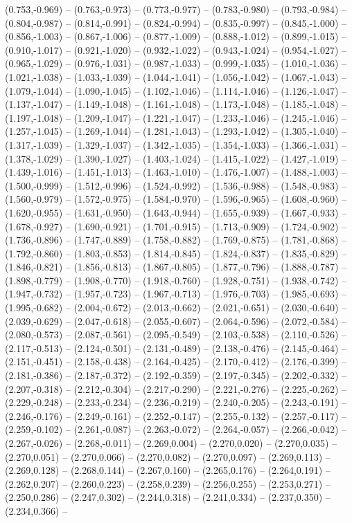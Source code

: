 (0.753,-0.969) -- (0.763,-0.973) -- (0.773,-0.977) -- (0.783,-0.980) -- (0.793,-0.984) -- (0.804,-0.987) -- (0.814,-0.991) -- (0.824,-0.994) -- (0.835,-0.997) -- (0.845,-1.000) -- (0.856,-1.003) -- (0.867,-1.006) -- (0.877,-1.009) -- (0.888,-1.012) -- (0.899,-1.015) -- (0.910,-1.017) -- (0.921,-1.020) -- (0.932,-1.022) -- (0.943,-1.024) -- (0.954,-1.027) -- (0.965,-1.029) -- (0.976,-1.031) -- (0.987,-1.033) -- (0.999,-1.035) -- (1.010,-1.036) -- (1.021,-1.038) -- (1.033,-1.039) -- (1.044,-1.041) -- (1.056,-1.042) -- (1.067,-1.043) -- (1.079,-1.044) -- (1.090,-1.045) -- (1.102,-1.046) -- (1.114,-1.046) -- (1.126,-1.047) -- (1.137,-1.047) -- (1.149,-1.048) -- (1.161,-1.048) -- (1.173,-1.048) -- (1.185,-1.048) -- (1.197,-1.048) -- (1.209,-1.047) -- (1.221,-1.047) -- (1.233,-1.046) -- (1.245,-1.046) -- (1.257,-1.045) -- (1.269,-1.044) -- (1.281,-1.043) -- (1.293,-1.042) -- (1.305,-1.040) -- (1.317,-1.039) -- (1.329,-1.037) -- (1.342,-1.035) -- (1.354,-1.033) -- (1.366,-1.031) -- (1.378,-1.029) -- (1.390,-1.027) -- (1.403,-1.024) -- (1.415,-1.022) -- (1.427,-1.019) -- (1.439,-1.016) -- (1.451,-1.013) -- (1.463,-1.010) -- (1.476,-1.007) -- (1.488,-1.003) -- (1.500,-0.999) -- (1.512,-0.996) -- (1.524,-0.992) -- (1.536,-0.988) -- (1.548,-0.983) -- (1.560,-0.979) -- (1.572,-0.975) -- (1.584,-0.970) -- (1.596,-0.965) -- (1.608,-0.960) -- (1.620,-0.955) -- (1.631,-0.950) -- (1.643,-0.944) -- (1.655,-0.939) -- (1.667,-0.933) -- (1.678,-0.927) -- (1.690,-0.921) -- (1.701,-0.915) -- (1.713,-0.909) -- (1.724,-0.902) -- (1.736,-0.896) -- (1.747,-0.889) -- (1.758,-0.882) -- (1.769,-0.875) -- (1.781,-0.868) -- (1.792,-0.860) -- (1.803,-0.853) -- (1.814,-0.845) -- (1.824,-0.837) -- (1.835,-0.829) -- (1.846,-0.821) -- (1.856,-0.813) -- (1.867,-0.805) -- (1.877,-0.796) -- (1.888,-0.787) -- (1.898,-0.779) -- (1.908,-0.770) -- (1.918,-0.760) -- (1.928,-0.751) -- (1.938,-0.742) -- (1.947,-0.732) -- (1.957,-0.723) -- (1.967,-0.713) -- (1.976,-0.703) -- (1.985,-0.693) -- (1.995,-0.682) -- (2.004,-0.672) -- (2.013,-0.662) -- (2.021,-0.651) -- (2.030,-0.640) -- (2.039,-0.629) -- (2.047,-0.618) -- (2.055,-0.607) -- (2.064,-0.596) -- (2.072,-0.584) -- (2.080,-0.573) -- (2.087,-0.561) -- (2.095,-0.549) -- (2.103,-0.538) -- (2.110,-0.526) -- (2.117,-0.513) -- (2.124,-0.501) -- (2.131,-0.489) -- (2.138,-0.476) -- (2.145,-0.464) -- (2.151,-0.451) -- (2.158,-0.438) -- (2.164,-0.425) -- (2.170,-0.412) -- (2.176,-0.399) -- (2.181,-0.386) -- (2.187,-0.372) -- (2.192,-0.359) -- (2.197,-0.345) -- (2.202,-0.332) -- (2.207,-0.318) -- (2.212,-0.304) -- (2.217,-0.290) -- (2.221,-0.276) -- (2.225,-0.262) -- (2.229,-0.248) -- (2.233,-0.234) -- (2.236,-0.219) -- (2.240,-0.205) -- (2.243,-0.191) -- (2.246,-0.176) -- (2.249,-0.161) -- (2.252,-0.147) -- (2.255,-0.132) -- (2.257,-0.117) -- (2.259,-0.102) -- (2.261,-0.087) -- (2.263,-0.072) -- (2.264,-0.057) -- (2.266,-0.042) -- (2.267,-0.026) -- (2.268,-0.011) -- (2.269,0.004) -- (2.270,0.020) -- (2.270,0.035) -- (2.270,0.051) -- (2.270,0.066) -- (2.270,0.082) -- (2.270,0.097) -- (2.269,0.113) -- (2.269,0.128) -- (2.268,0.144) -- (2.267,0.160) -- (2.265,0.176) -- (2.264,0.191) -- (2.262,0.207) -- (2.260,0.223) -- (2.258,0.239) -- (2.256,0.255) -- (2.253,0.271) -- (2.250,0.286) -- (2.247,0.302) -- (2.244,0.318) -- (2.241,0.334) -- (2.237,0.350) -- (2.234,0.366) -- 